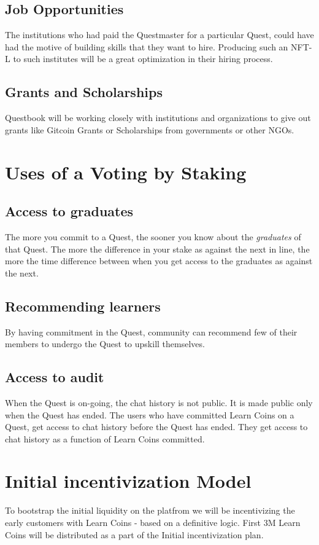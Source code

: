 \documentclass{article}
\begin{document}
    \subsection{Job Opportunities}
      The institutions who had paid the Questmaster for a particular Quest, could have had the motive of building skills that they want to hire. Producing such an NFT-L to such institutes will be a great optimization in their hiring process.
    \subsection{Grants and Scholarships}
      Questbook will be working closely with institutions and organizations to give out grants like Gitcoin Grants or Scholarships from governments or other NGOs.
  \section{Uses of a Voting by Staking}
    \subsection{Access to graduates}
      The more you commit to a Quest, the sooner you know about the \textit{graduates} of that Quest.
      The more the difference in your stake as against the next in line, the more the time difference between when you get access to the graduates as against the next. %
    \subsection{Recommending learners}
      By having commitment in the Quest, community can recommend few of their members to undergo the Quest to upskill themselves.
    \subsection{Access to audit}
      When the Quest is on-going, the chat history is not public. It is made public only when the Quest has ended.
      The users who have committed Learn Coins on a Quest, get access to chat history before the Quest has ended. 
      They get access to chat history as a function of Learn Coins committed.

  \section{Initial incentivization Model}
    To bootstrap the initial liquidity on the platfrom we will be incentivizing the early customers with Learn Coins - based on a definitive logic.
    First 3M Learn Coins will be distributed as a part of the Initial incentivization plan.
\end{document}
